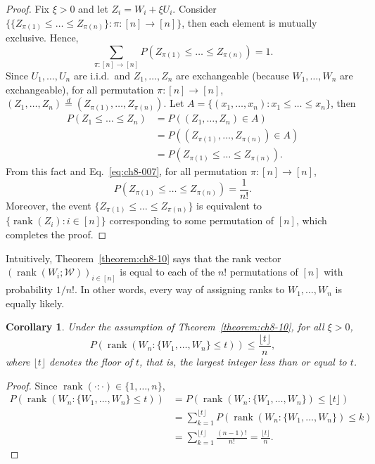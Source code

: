 \documentclass[a4paper,12pt]{article}
\numberwithin{equation}{section}
\theoremstyle{plain}
\newtheorem{corollary}[theorem]{Corollary}
\theoremstyle{definition}
\theoremstyle{remark}
\begin{document}
\begin{proof}
    Fix $\xi>0$ and let $Z_i=W_i+\xi U_i.$ Consider $\{\{Z_{\pi(1)}\leq\dots\leq Z_{\pi(n)}\}:\pi:[n]\to[n]\}$, then each element is mutually exclusive. Hence,
    \begin{equation}
        \sum_{\pi:[n]\to[n]}P(Z_{\pi(1)}\leq\dots\leq Z_{\pi(n)})=1.
        \label{eq:ch8-007}
    \end{equation}
    Since $U_1,\dots,U_n$ are i.i.d.\ and $Z_1,\dots,Z_n$ are exchangeable (because $W_1,\dots,W_n$ are exchangeable), for all permutation $\pi:[n]\to[n]$, $(Z_1,\dots,Z_n)\overset{d}{=}(Z_{\pi(1)},\dots,Z_{\pi(n)})$. Let $A=\{(x_1,\dots,x_n):x_1\leq\dots\leq x_n\}$, then
    \begin{align}
        P(Z_1\leq\dots\leq Z_n)
        &= P((Z_1,\dots,Z_n)\in A)\nonumber\\
        &= P((Z_{\pi(1)},\dots,Z_{\pi(n)})\in A)\nonumber\\
        &= P(Z_{\pi(1)}\leq\dots\leq Z_{\pi(n)}).
        \label{eq:ch8-008}
    \end{align}
    From this fact and Eq.~\eqref{eq:ch8-007}, for all permutation $\pi:[n]\to[n]$,
    \begin{equation}
        P(Z_{\pi(1)}\leq\dots\leq Z_{\pi(n)}) = \frac{1}{n!}.
        \label{eq:ch8-009}
    \end{equation}
    Moreover, the event $\{Z_{\pi(1)}\leq\dots\leq Z_{\pi(n)}\}$ is equivalent to $\{\operatorname{rank}(Z_i):i\in[n]\}$ corresponding to some permutation of $[n]$, which completes the proof. 
\end{proof}

Intuitively, Theorem~\ref{theorem:ch8-10} says that the rank vector $(\operatorname{rank}(W_i;\mathcal{W}))_{i\in[n]}$ is equal to each of the $n!$ permutations of $[n]$ with probability $1/n!$. In other words, every way of assigning ranks to $W_1,\dots,W_n$ is equally likely.

\begin{corollary}
\label{corollary:ch8-11}
    Under the assumption of Theorem~\ref{theorem:ch8-10}, for all $\xi>0$,
    \[
    P(\operatorname{rank}(W_n:\{W_1,\dots,W_n\}\leq t))\leq \frac{\lfloor t \rfloor}{n},
    \]
    where $\lfloor t\rfloor$ denotes the floor of $t$, that is, the largest integer less than or equal to $t$.
\end{corollary}

\begin{proof}
    Since $\operatorname{rank}(\cdot :\cdot)\in\{1,\dots,n\}$, 
    \begin{align*}
        P(\operatorname{rank}(W_n:\{W_1,\dots,W_n\}\leq t))
        &= P(\operatorname{rank}(W_n:\{W_1,\dots,W_n\})\leq \lfloor t\rfloor)\\
        &= \sum_{k=1}^{\lfloor t \rfloor}P(\operatorname{rank}(W_n:\{W_1,\dots,W_n\})\leq k)\\
        &= \sum_{k=1}^{\lfloor t\rfloor}\frac{(n-1)!}{n!} =\frac{\lfloor t \rfloor}{n}.
    \end{align*}
\end{proof}
\end{document}
